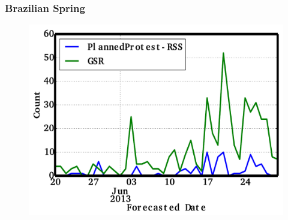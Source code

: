 \documentclass[red]{beamer}
\begin{document}
\begin{frame}
    \frametitle{Brazilian Spring}
    \begin{figure}
        \centering
        \includegraphics[scale=0.4]{brazil_june}
    \end{figure}
\end{frame}
\end{document}
